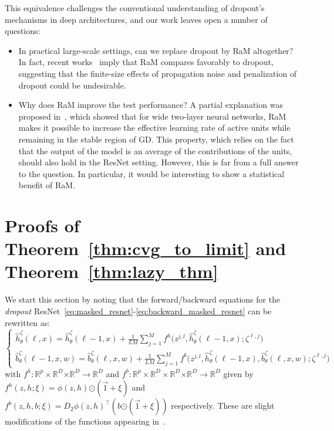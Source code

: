 \documentclass[a4paper,11pt]{article}
\newcommand{\R}{\mathbb{R}}
\newcommand{\1}{\mathbbm{1}}
\theoremstyle{definition}
\theoremstyle{remark}
\begin{document}
This equivalence challenges the conventional understanding of dropout's mechanisms in
deep architectures, and our work leaves open a number of questions:
\begin{itemize}
\item In practical large-scale settings, can we replace dropout by RaM altogether? In fact, recent works~\cite{joo2026surprisingeffectivenessmaskingupdates, liu2025drop} imply that RaM compares favorably to dropout, suggesting that the finite-size effects of propagation noise and penalization of dropout could be undesirable.
\item Why does RaM improve the test performance? A partial explanation was proposed in~\cite{chizat2025phasediagramdropouttwolayer}, which showed that for wide two-layer neural networks, RaM makes it possible to increase the effective learning rate of active units while remaining in the stable region of GD. This property, which relies on the fact that the output of the model is an average of the contributions of the units, should also hold in the ResNet setting. However, this is far from a full answer to the question. In particular, it would be interesting to show a statistical benefit of RaM.
\end{itemize} 



\newpage
\printbibliography

\newpage

\appendix

\section{Proofs of Theorem~\ref{thm:cvg_to_limit} and Theorem~\ref{thm:lazy_thm}}
We start this section by noting that the forward/backward equations for the \emph{dropout} ResNet~\eqref{eq:masked_resnet}-\eqref{eq:backward_masked_resnet} can be rewritten as:
\begin{equation}\label{eq:simplified_resnet_dropout}
    \begin{cases}
    \hat{h}_\theta^{\zeta}(\ell, x) = \hat{h}_\theta^{\zeta}(\ell-1, x) + \frac{1}{LM}\sum_{j=1}^M f^{h}(z^{j,l}, \hat{h}_\theta^{\zeta}(\ell-1, x){; \zeta^{\ell, j})}\\
    \hat{b}_\theta^{\zeta}(\ell-1, x, w) = \hat{b}_\theta^{\zeta}(\ell, x, w) + \frac{1}{LM}\sum_{j=1}^M f^{b}(z^{j,l}, \hat{h}_\theta^{\zeta}(\ell-1, x), \hat{b}_\theta^{\zeta}(\ell, x, w){; \zeta^{\ell, j})}
\end{cases}
\end{equation}
with $f^h: \R^p\times\R^D{\times\R^{D}} \to \R^{D}$ and $f^b: \R^p\times\R^D\times \R^D{\times\R^{D}} \to \R^{D}$ given by $f^h(z, h{; \xi}) = \phi(z, h) {\odot (\vec{1}+\xi)}$ and $f^b(z, h, b{; \xi}) = D_2\phi(z, h)^\top(b{\odot (\vec{1}+\xi)})$ respectively. {These are slight modifications of the functions appearing in~\cite{chizat2025hidden}.}
\end{document}

